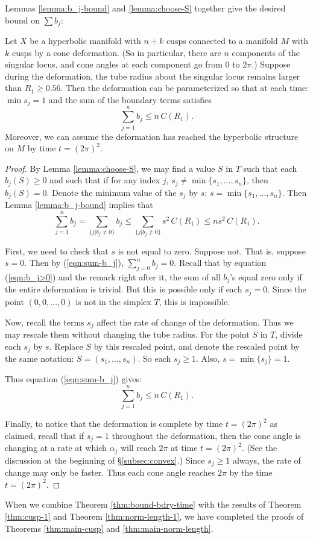 
Lemmas \ref{lemma:b_j-bound} and \ref{lemma:choose-S} together give
the desired bound on $\sum b_j$:

\begin{theorem}
  Let $X$ be a hyperbolic manifold with $n+k$ cusps connected to a
  manifold $M$ with $k$ cusps by a cone deformation.  (So in
  particular, there are $n$ components of the singular locus, and cone
  angles at each component go from $0$ to $2\pi$.)  Suppose during the
  deformation, the tube radius about the singular locus remains larger
  than $R_1 \geq 0.56$.
	Then the deformation can be parameterized so that at each time: $\min
	s_j =1$ and the sum of the boundary terms satisfies
  $$\sum_{j=1}^n b_j \leq n\,C(R_1).$$
  Moreover, we can assume the
  deformation has reached the hyperbolic structure on $M$ by time
  $t=(2\pi)^2$.
  \label{thm:bound-bdry-time}
\end{theorem}

\begin{proof}
  
  By Lemma \ref{lemma:choose-S}, we may find a value $S$ in $T$ such
  that each $b_j(S) \geq 0$ and such that if for any index $j$, $s_j
  \neq \min\{s_1, \dots, s_n\}$, then $b_j(S)=0$.  Denote the minimum
  value of the $s_j$ by $s$: $s=\min\{s_1,\dots, s_n\}$.  Then Lemma
  \ref{lemma:b_j-bound} implies that
\begin{equation}
  \sum_{j=1}^n b_j = \sum_{\{j|b_j\neq 0\}} b_j \leq \sum_{\{j|b_j\neq
  0\}} s^2\,C(R_1) \leq n s^2\,C(R_1).
\label{eqn:sum-b_j}
\end{equation}

First, we need to check that $s$ is not equal to zero.  Suppose not.
That is, suppose $s=0$.  Then by (\ref{eqn:sum-b_j}), $\sum_{j=0}^n
b_j = 0$.  Recall that by equation (\ref{eqn:b_j>0}) and the remark
right after it, the sum of all $b_j$'s equal zero only if the entire
deformation is trivial.  But this is possible only if each $s_j=0$.
Since the point $(0, 0, \dots, 0)$ is not in the simplex $T$, this is
impossible.

Now, recall the terms $s_j$ affect the rate of change of the
deformation.  Thus we may rescale them without changing the tube
radius.  For the point $S$ in $T$, divide each $s_j$ by $s$.
Replace $S$ by this rescaled point, and denote the rescaled
point by the same notation: $S=(s_1, \dots, s_n)$.  So each $s_j\geq
1$.  Also, $s=\min\{s_j\}=1$.

Thus equation (\ref{eqn:sum-b_j}) gives:
$$\sum_{j=1}^n b_j \leq n\,C(R_1).$$
  
Finally, to notice that the deformation is complete by time
$t=(2\pi)^2$ as claimed, recall that if $s_j=1$ throughout the
deformation, then the cone angle is changing at a rate at which
$\alpha_j$ will reach $2\pi$ at time $t=(2\pi)^2$.  (See the
discussion at the beginning of \S\ref{subsec:convex}.)  Since $s_j\geq
1$ always, the rate of change may only be faster.  Thus each cone
angle reaches $2\pi$ by the time $t=(2\pi)^2$.
\end{proof}

When we combine Theorem \ref{thm:bound-bdry-time} with the results of
Theorem \ref{thm:cusp-1} and Theorem \ref{thm:norm-length-1}, we have
completed the proofs of Theorems \ref{thm:main-cusp} and
\ref{thm:main-norm-length}.


